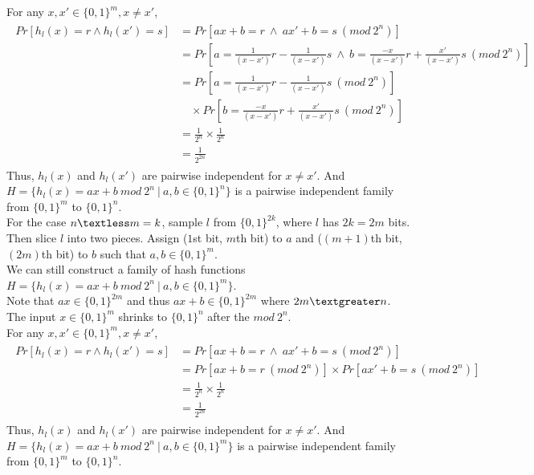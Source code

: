 \documentclass[titlepage, paper=a4, fontsize=11pt]{scrartcl} %
\numberwithin{equation}{section} %
\numberwithin{figure}{section} %
\numberwithin{table}{section} %
\begin{document}
For any $x,x' \in \{0,1\}^m, x \neq x'$,
\begin{align*} 
\begin{split}
Pr[h_l(x) = r \land h_l(x') = s] &= Pr[ax+b=r \ \land \ ax'+b=s \  (mod\ 2^n)] \\
&= Pr[a=\frac{1}{(x-x')}r - \frac{1}{(x-x')}s\ \land \ b=\frac{-x}{(x-x')}r + \frac{x'}{(x-x')}s\  (mod\ 2^n)] \\
&= Pr[a=\frac{1}{(x-x')}r - \frac{1}{(x-x')}s\  (mod\ 2^n)] \\
&\quad \times Pr[b=\frac{-x}{(x-x')}r + \frac{x'}{(x-x')}s\  (mod\ 2^n)] \\
&= \frac{1}{2^n} \times \frac{1}{2^n} \\
&= \frac{1}{2^{2n}}
\end{split}					
\end{align*}
Thus, $h_l(x)$ and $h_l(x')$ are pairwise independent for $x \neq x'$. And $H=\{ h_l(x)=ax+b \ mod\ 2^n\ |\ a,b \in \{0,1\}^n \}$ is a pairwise independent family from $\{0,1\}^m$ to $\{0,1\}^n$. \\

For the case $n \textless m = k$, sample $l$ from $\{0,1\}^{2k}$, where $l$ has $2k=2m$ bits. Then slice $l$ into two pieces.
Assign ($1$st bit, $m$th bit) to $a$ and ($(m+1)$th bit, $(2m)$th bit) to $b$ such that $a,b \in \{0,1\}^m$. \\
We can still construct a family of hash functions $H=\{ h_l(x)=ax+b \ mod \ 2^n\ |\ a,b \in \{0,1\}^m \}$. \\
Note that $ax \in \{0,1\}^{2m}$ and thus $ax+b \in \{0,1\}^{2m}$ where
$2m \textgreater n$. The input $x \in \{0,1\}^m$ shrinks to $\{0,1\}^n$ after the $mod \ 2^n$. \\

For any $x,x' \in \{0,1\}^m, x \neq x'$,
\begin{align*} 
\begin{split}
Pr[h_l(x) = r \land h_l(x') = s] &= Pr[ax+b=r \ \land \ ax'+b=s \  (mod\ 2^n)] \\
&= Pr[ax+b=r \  (mod\ 2^n)] \times Pr[ax'+b=s \ (mod\ 2^n)] \\
&= \frac{1}{2^n} \times \frac{1}{2^n} \\
&= \frac{1}{2^{2n}}
\end{split}					
\end{align*}
Thus, $h_l(x)$ and $h_l(x')$ are pairwise independent for $x \neq x'$. And $H=\{ h_l(x)=ax+b \ mod\ 2^n\ |\ a,b \in \{0,1\}^m \}$ is a pairwise independent family from $\{0,1\}^m$ to $\{0,1\}^n$. \\
\\
\end{document}

